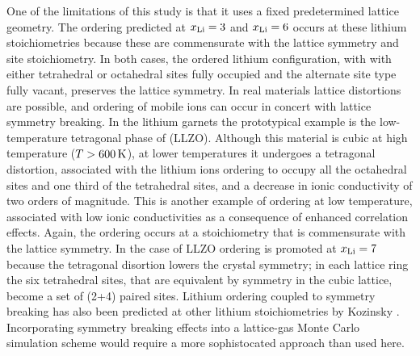 \documentclass[aps,prb,twocolumn,superscriptaddress,reprint]{revtex4-1}
\newcommand{\xLi}{x_\m{Li}}
\begin{document}
One of the limitations of this study is that it uses a fixed predetermined lattice geometry. The ordering predicted at $\xLi=3$ and $\xLi=6$ occurs at these lithium stoichiometries because these are commensurate with the lattice symmetry and site stoichiometry. In both cases, the ordered lithium configuration, with with either tetrahedral or octahedral sites fully occupied and the alternate site type fully vacant, preserves the lattice symmetry. In real materials lattice distortions are possible, and ordering of mobile ions can occur in concert with lattice symmetry breaking. In the lithium garnets the prototypical example is the low-temperature tetragonal phase of  (LLZO).\cite{BernsteinEtAl_PhysRevLett2012,AwakaEtAl_ChemLett2011} Although this material is cubic at high temperature ($T>600\,\mathrm{K}$), at lower temperatures it undergoes a tetragonal distortion, associated with the lithium ions ordering to occupy all the octahedral sites and one third of the tetrahedral sites, and a decrease in ionic conductivity of two orders of magnitude. This is another example of ordering at low temperature, associated with low ionic conductivities as a consequence of enhanced correlation effects.\cite{BurbanoEtAl_PhysRevLett2016} Again, the ordering occurs at a stoichiometry that is commensurate with the lattice symmetry. In the case of LLZO ordering is promoted at $\xLi=7$ because the tetragonal disortion lowers the crystal symmetry; in each lattice ring the six tetrahedral sites, that are equivalent by symmetry in the cubic lattice, become a set of (2+4) paired sites. Lithium ordering coupled to symmetry breaking has also been predicted at other lithium stoichiometries by Kozinsky \etal.\cite{KozinskyEtAl_PhysRevLett2016} Incorporating symmetry breaking effects into a lattice-gas Monte Carlo simulation scheme would require a more sophistocated approach than used here.
\end{document}
